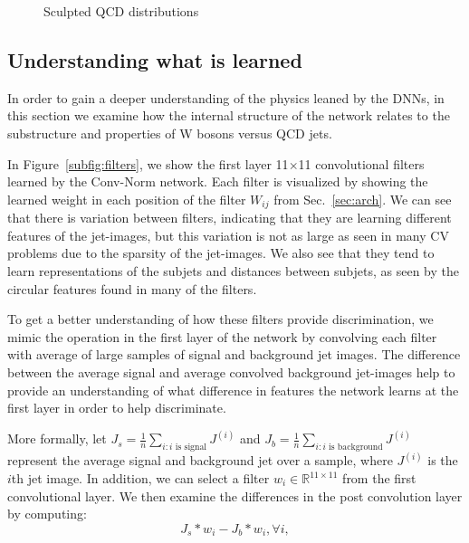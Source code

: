 \begin{figure}[htbp!]
\begin{center}
      \caption{Sculpted QCD distributions}
      \label{fig:qcdsculpt}

    \end{center}
\end{figure}

\subsection{Understanding what is learned} %
\label{ssub:understanding_what_is_learned}

In order to gain a deeper understanding of the physics leaned by the DNNs, in this section we examine how the internal structure of the network relates to the substructure and properties of W bosons versus QCD jets.



In Figure~\ref{subfig:filters}, we show the first layer 11$\times$11 convolutional filters learned by the Conv-Norm network. Each filter is visualized by showing the learned weight in each position of the filter $W_{ij}$ from Sec.~\ref{sec:arch}.  We can see that there is variation between filters, indicating that they are learning different features of the jet-images, but this variation is not as large as seen in many CV problems due to the sparsity of the jet-images.  We also see that they tend to learn representations of the subjets and distances between subjets, as seen by the circular features found in many of the filters.

To get a better understanding of how these filters provide discrimination, we mimic the operation in the first layer of the network by convolving each filter with average of large samples of signal and background jet images.  The difference between the average signal and average convolved background jet-images help to provide an understanding of what difference in features the network learns at the first layer in order to help discriminate.

More formally, let $J_s=\frac{1}{n}\sum_{i:i\text{ is signal}} J^{(i)}$ and $J_b=\frac{1}{n}\sum_{i:i\text{ is background}}J^{(i)}$ represent the average signal and background jet over a sample, where $J^{(i)}$ is the $i$th jet image. In addition, we can select a filter $w_i\in\mathbb{R}^{11\times11}$ from the first convolutional layer. We then examine the differences in the post convolution layer by computing:
\begin{equation}
  J_s \ast w_i - J_b \ast w_i, \forall i,
\end{equation}

